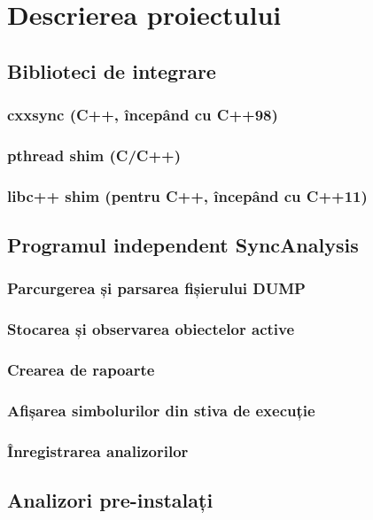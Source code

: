 \section{Descrierea proiectului}




\subsection{Biblioteci de integrare}
\label{integration-libraries}
\subsubsection{cxxsync (C++, începând cu C++98)}
\subsubsection{pthread shim (C/C++)}
\subsubsection{libc++ shim (pentru C++, începând cu C++11)}
\subsection{Programul independent SyncAnalysis}
\label{executable}
\subsubsection{Parcurgerea și parsarea fișierului DUMP}
\subsubsection{Stocarea și observarea obiectelor active}
\subsubsection{Crearea de rapoarte}
\subsubsection{Afișarea simbolurilor din stiva de execuție}
\label{stack-reconstruction}
\subsubsection{Înregistrarea analizorilor}
\label{analyzers}
\subsection{Analizori pre-instalați}

